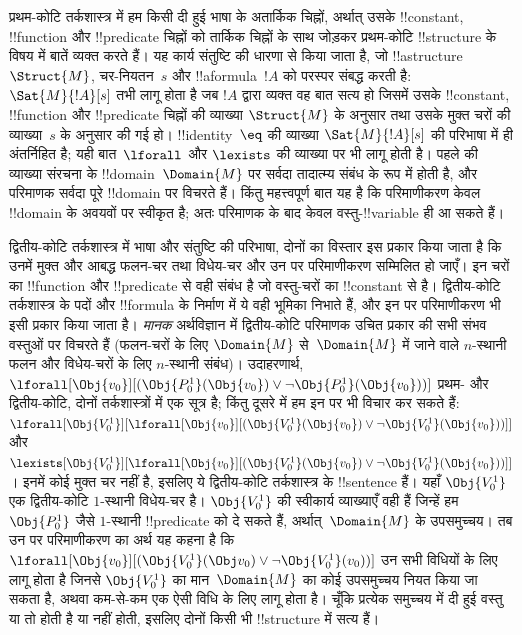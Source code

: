 \documentclass[../../../include/open-logic-section]{subfiles}
\begin{document}


प्रथम-कोटि तर्कशास्त्र में हम किसी दी हुई भाषा के अतार्किक चिह्नों, अर्थात्
उसके !!{constant}, !!{function} और !!{predicate} चिह्नों को तार्किक चिह्नों
के साथ जोड़कर प्रथम-कोटि !!{structure} के विषय में बातें व्यक्त करते हैं। यह
कार्य संतुष्टि की धारणा से किया जाता है, जो !!a{structure}~$\Struct{M}$,
चर-नियतन~$s$ और !!a{formula}~$!A$ को परस्पर संबद्ध करती है:
$\Sat{M}{!A}[s]$ तभी लागू होता है जब $!A$ द्वारा व्यक्त वह बात सत्य हो जिसमें
उसके !!{constant}, !!{function} और !!{predicate} चिह्नों की व्याख्या
$\Struct{M}$ के अनुसार तथा उसके मुक्त चरों की व्याख्या~$s$ के अनुसार की गई
हो। !!{identity}~$\eq$ की व्याख्या $\Sat{M}{!A}[s]$ की परिभाषा में ही
अंतर्निहित है; यही बात~$\lforall$ और $\lexists$ की व्याख्या पर भी लागू होती
है। पहले की व्याख्या संरचना के !!{domain}~$\Domain{M}$ पर सर्वदा तादात्म्य
संबंध के रूप में होती है, और परिमाणक सर्वदा पूरे !!{domain} पर विचरते हैं।
किंतु महत्त्वपूर्ण बात यह है कि परिमाणीकरण केवल !!{domain} के अवयवों पर
स्वीकृत है; अतः परिमाणक के बाद केवल वस्तु-!!{variable} ही आ सकते हैं।

द्वितीय-कोटि तर्कशास्त्र में भाषा और संतुष्टि की परिभाषा, दोनों का विस्तार
इस प्रकार किया जाता है कि उनमें मुक्त और आबद्ध फलन-चर तथा विधेय-चर और उन पर
परिमाणीकरण सम्मिलित हो जाएँ। इन चरों का !!{function} और !!{predicate} से वही
संबंध है जो वस्तु-चरों का !!{constant} से है। द्वितीय-कोटि तर्कशास्त्र के पदों
और !!{formula} के निर्माण में ये वही भूमिका निभाते हैं, और इन पर परिमाणीकरण
भी इसी प्रकार किया जाता है। \emph{मानक} अर्थविज्ञान में द्वितीय-कोटि
परिमाणक उचित प्रकार की सभी संभव वस्तुओं पर विचरते हैं (फलन-चरों के लिए
$\Domain{M}$ से~$\Domain{M}$ में जाने वाले $n$-स्थानी फलन और विधेय-चरों के
लिए $n$-स्थानी संबंध)। उदाहरणार्थ,
$\lforall[\Obj{v_0}][(\Obj{P^1_0}(\Obj{v_0}) \lor \lnot
  \Obj{P^1_0}(\Obj{v_0}))]$ प्रथम- और द्वितीय-कोटि, दोनों तर्कशास्त्रों में एक सूत्र है; किंतु दूसरे में हम
इन पर भी विचार कर सकते हैं:
$\lforall[\Obj{V^1_0}][\lforall[\Obj{v_0}][(\Obj{V^1_0}(\Obj{v_0}) \lor
    \lnot \Obj{V^1_0}(\Obj{v_0}))]]$ और
$\lexists[\Obj{V^1_0}][\lforall[\Obj{v_0}][(\Obj{V^1_0}(\Obj{v_0}) \lor
    \lnot \Obj{V^1_0}(\Obj{v_0}))]]$। इनमें कोई मुक्त चर नहीं है, इसलिए ये
द्वितीय-कोटि तर्कशास्त्र के !!{sentence} हैं। यहाँ $\Obj{V^1_0}$ एक
द्वितीय-कोटि $1$-स्थानी विधेय-चर है। $\Obj{V^1_0}$ की स्वीकार्य व्याख्याएँ
वही हैं जिन्हें हम $\Obj{P^1_0}$ जैसे $1$-स्थानी !!{predicate} को दे सकते
हैं, अर्थात्~$\Domain{M}$ के उपसमुच्चय। तब उन पर परिमाणीकरण का अर्थ यह कहना
है कि
$\lforall[\Obj{v_0}][(\Obj{V^1_0}(\Obj v_0) \lor \lnot
  \Obj{V^1_0}(v_0))]$ उन सभी विधियों के लिए लागू होता है जिनसे
$\Obj{V^1_0}$ का मान~$\Domain{M}$ का कोई उपसमुच्चय नियत किया जा सकता है,
अथवा कम-से-कम एक ऐसी विधि के लिए लागू होता है। चूँकि प्रत्येक समुच्चय में
दी हुई वस्तु या तो होती है या नहीं होती, इसलिए दोनों किसी भी !!{structure}
में सत्य हैं।
\end{document}
